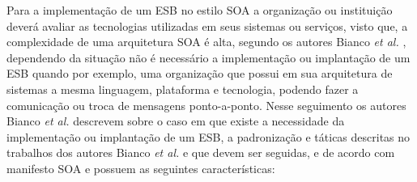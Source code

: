Para a implementação de um \acrshort{ESB} no estilo \acrshort{SOA} a organização ou instituição deverá avaliar as tecnologias utilizadas em seus sistemas ou serviços, visto que, a complexidade de uma arquitetura \acrshort{SOA} é alta, segundo os autores Bianco \textit{et al.} \cite{bianco2011architecting}, dependendo da situação não é necessário a implementação ou implantação de um \acrshort{ESB} quando por exemplo, uma organização que  possui em sua arquitetura de sistemas a mesma linguagem, plataforma e tecnologia, podendo fazer a comunicação ou troca de mensagens ponto-a-ponto. Nesse seguimento os autores Bianco \textit{et al.} \cite{bianco2011architecting} descrevem sobre o caso em que existe a necessidade da implementação ou implantação de um \acrshort{ESB}, a padronização e táticas descritas no trabalhos dos autores Bianco \textit{et al.}  \cite{bianco2011architecting} e que devem ser seguidas, e de acordo com manifesto \acrshort{SOA}\cite{erl2009soa} e possuem as seguintes características:

